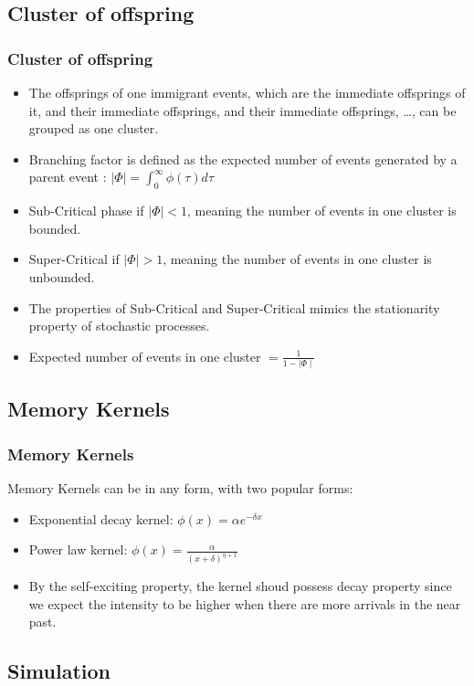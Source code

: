 \documentclass{beamer}
\begin{document}
\subsection{Cluster of offspring}
\begin{frame}
\frametitle{Cluster of offspring}
\begin{itemize}
	\item The offsprings of one immigrant events, which are the immediate offsprings of it, and their immediate offsprings, and their immediate offsprings, \dots, can be grouped as one cluster.
	\item Branching factor is defined as the expected number of events generated by a parent event : $\mid \Phi \mid = \int_0^{\infty} \phi(\tau) d\tau$
	\item Sub-Critical phase if $\mid \Phi \mid < 1$, meaning the number of events in one cluster is bounded.
	\item Super-Critical if $\mid \Phi \mid > 1$, meaning the number of events in one cluster is unbounded.
	\item The properties of Sub-Critical and Super-Critical mimics the stationarity property of stochastic processes.
	\item Expected number of events in one cluster $ = \frac{1}{1 - \mid \Phi \mid}$
\end{itemize}
\end{frame}

\subsection{Memory Kernels}
\begin{frame}
\frametitle{Memory Kernels}
Memory Kernels can be in any form, with two popular forms:
\begin{itemize}
	\item Exponential decay kernel: $\phi(x) = \alpha e^{-\delta x}$
	\item Power law kernel: $\phi(x) = \frac{\alpha}{(x + \delta)^{\eta + 1}}$
	\item By the self-exciting property, the kernel shoud possess decay property since we expect the intensity to be higher when there are more arrivals in the near past.
\end{itemize}
\end{frame}

\subsection{Simulation}
\end{document}
